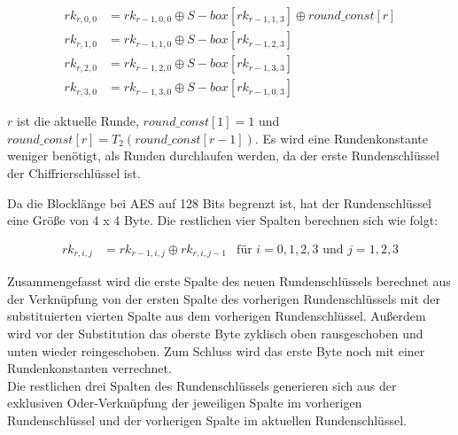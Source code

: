    \begin{equation*}
     \begin{aligned}
     rk_{r,0,0} &= rk_{r-1,0,0} \oplus S-box[rk_{r-1,1,3}] \oplus round\_const[r] \\
     rk_{r,1,0} &= rk_{r-1,1,0} \oplus S-box[rk_{r-1,2,3}] \\
     rk_{r,2,0} &= rk_{r-1,2,0} \oplus S-box[rk_{r-1,3,3}] \\
     rk_{r,3,0} &= rk_{r-1,3,0} \oplus S-box[rk_{r-1,0,3}]
     \end{aligned}
    \end{equation*}
    
   $r$ ist die aktuelle Runde, $round\_const[1] = 1$ und $round\_const[r] = T_2(round\_const[r-1])$. Es wird eine
   Rundenkonstante weniger benötigt, als Runden durchlaufen werden, da der erste Rundenschlüssel der 
   Chiffrierschlüssel ist.
   
   Da die Blocklänge bei AES auf 128 Bits begrenzt ist, hat der Rundenschlüssel eine Größe von 4 x 4 Byte. Die
   restlichen vier Spalten berechnen sich wie folgt:
   
    \begin{equation*}
     \begin{aligned}
      rk_{r,i,j} &= rk_{r-1,i,j} \oplus rk_{r,i,j-1} &\text{für $i = 0, 1, 2, 3$ und $j = 1, 2, 3$}
     \end{aligned}
    \end{equation*}
    
   Zusammengefasst wird die erste Spalte des neuen Rundenschlüssels berechnet aus der Verknüpfung
   von der ersten Spalte des vorherigen Rundenschlüssels mit der substituierten vierten Spalte aus dem vorherigen
   Rundenschlüssel. Außerdem wird vor der Substitution das oberste Byte zyklisch oben rausgeschoben und unten
   wieder reingeschoben. Zum Schluss wird das erste Byte noch mit einer Rundenkonstanten verrechnet. \\
   Die restlichen drei Spalten des Rundenschlüssels generieren sich aus der exklusiven Oder-Verknüpfung der
   jeweiligen Spalte im vorherigen Rundenschlüssel und der vorherigen Spalte im aktuellen Rundenschlüssel.


